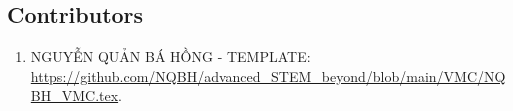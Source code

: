 \documentclass{article}
\begin{document}
\subsection{Contributors}

\begin{enumerate}
	\item {\sc NGUYỄN QUẢN BÁ HỒNG - TEMPLATE}: \url{https://github.com/NQBH/advanced_STEM_beyond/blob/main/VMC/NQBH_VMC.tex}.
\end{enumerate}


\printbibliography[heading=bibintoc]
	
\end{document}
